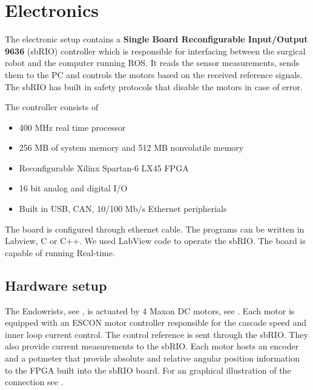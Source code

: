 \section{Electronics}\label{sec:electronics}

The electronic setup contains a \textbf{Single Board Reconfigurable Input/Output 9636} (sbRIO) controller which is responsible for interfacing between the surgical robot and the computer running ROS. It reads the sensor measurements, sends them to the PC and controls the motors based on the received reference signals. The sbRIO has built in safety protocols that disable the motors in case of error.

The controller consists of
\begin{itemize}
	\item 400 MHz real time processor
	\item 256 MB of system memory and 512 MB nonvolatile memory
	\item Reconfigurable Xilinx Spartan-6 LX45 FPGA
	\item 16 bit analog and digital I/O
	\item Built in USB, CAN, 10/100 Mb/s Ethernet peripherials
\end{itemize}

The board is configured through ethernet cable. The programs can be written in Labview, C or C++. We used LabView code to operate the sbRIO. The board is capable of running Real-time. %


\subsection{Hardware setup}

The Endowrists, see , is actuated by 4 Maxon DC motors, see . Each motor is equipped with an ESCON motor controller responsible for the cascade speed and inner loop current control. The control reference is sent through the sbRIO. They also provide current measurements to the sbRIO. Each motor hosts an encoder and a potmeter that provide absolute and relative angular position information to the FPGA built into the sbRIO board. For an graphical illustration of the connection see .
 
